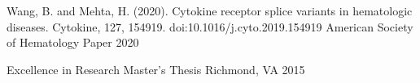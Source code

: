 

\begin{cvhonors}

    \cvhonor
      {Wang, B. and Mehta, H. (2020). Cytokine receptor splice variants in hematologic diseases. Cytokine, 127,
      154919. doi:10.1016/j.cyto.2019.154919} %
      {American Society of Hematology} %
      {Paper} %
      {2020} %
  
    \cvhonor
      {Excellence in Research} %
      {Master's Thesis} %
      {Richmond, VA} %
      {2015} %
  
  
  \end{cvhonors}
